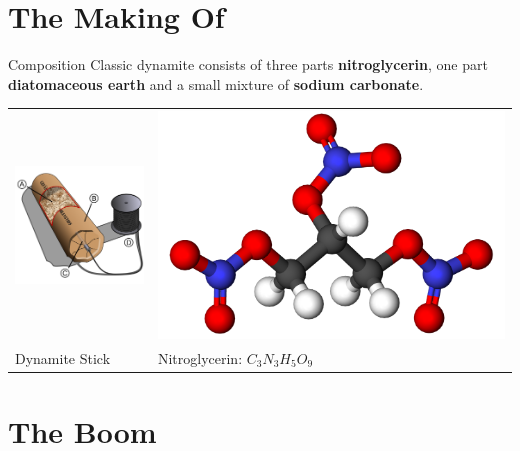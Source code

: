 \documentclass[xcolor=dvipsnames]{beamer}
\begin{document}
\section{The Making Of}
\begin{frame}{Composition}
Classic dynamite consists of three parts \textbf{nitroglycerin}, one part
\textbf{diatomaceous earth} and a small mixture of \textbf{sodium carbonate}.
\begin{center}
\begin{tabular}{ll}
\includegraphics[scale=0.47]{./img/dynamite.png} & \includegraphics[scale=0.16]{./img/nitroglycerin.png} \\
Dynamite Stick & Nitroglycerin: $C_3 N_3 H_5 O_9$
\end{tabular}
\end{center}

\end{frame}

\section{The Boom}
\end{document}
